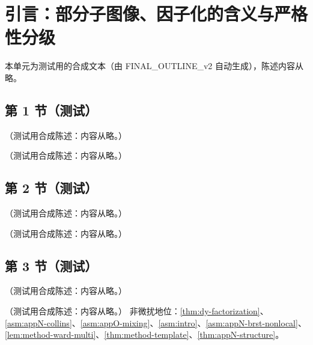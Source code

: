 \chapter{引言：部分子图像、因子化的含义与严格性分级}\label{ch:intro}
本单元为测试用的合成文本（由 FINAL\_OUTLINE\_v2 自动生成），陈述内容从略。

\section{第 1 节（测试）}\label{sec:intro-parton}

\begin{definition}[硬过程与幂次展开]\label{def:intro-hard-process}
（测试用合成陈述：内容从略。）
\end{definition}

\begin{definition}[共线因子化陈述]\label{def:intro-factorization}
（测试用合成陈述：内容从略。）
\end{definition}

\section{第 2 节（测试）}\label{sec:intro-statement}

\begin{remark}\label{rem:intro-incoherence}
（测试用合成陈述：内容从略。）
\end{remark}

\begin{example}\label{ex:intro-handbag}
（测试用合成陈述：内容从略。）
\end{example}

\section{第 3 节（测试）}\label{sec:intro-proof}

\begin{remark}\label{rem:intro-sharpness}
（测试用合成陈述：内容从略。）
\end{remark}

\begin{definition}\label{def:intro-tags}
（测试用合成陈述：内容从略。）
非微扰地位：\cref{thm:dy-factorization}、\cref{asm:appN-collins}、\cref{asm:appO-mixing}、\cref{asm:intro}、\cref{asm:appN-brst-nonlocal}、\cref{lem:method-ward-multi}、\cref{thm:method-template}、\cref{thm:appN-structure}。
\end{definition}

